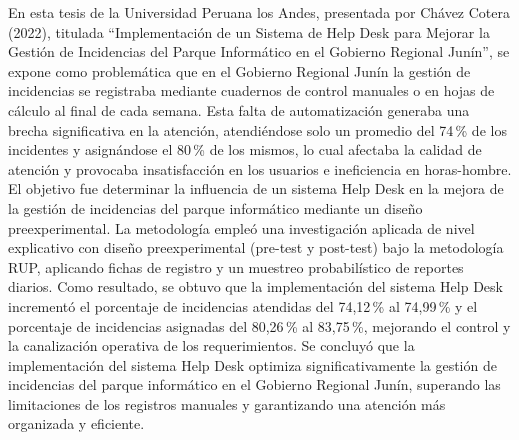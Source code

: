 En esta tesis de la Universidad Peruana los Andes, presentada por Chávez Cotera (2022), titulada ``Implementación de un Sistema de Help Desk para Mejorar la Gestión de Incidencias del Parque Informático en el Gobierno Regional Junín'', se expone como problemática que en el Gobierno Regional Junín la gestión de incidencias se registraba mediante cuadernos de control manuales o en hojas de cálculo al final de cada semana. Esta falta de automatización generaba una brecha significativa en la atención, atendiéndose solo un promedio del 74\,\% de los incidentes y asignándose el 80\,\% de los mismos, lo cual afectaba la calidad de atención y provocaba insatisfacción en los usuarios e ineficiencia en horas-hombre. El objetivo fue determinar la influencia de un sistema Help Desk en la mejora de la gestión de incidencias del parque informático mediante un diseño preexperimental. La metodología empleó una investigación aplicada de nivel explicativo con diseño preexperimental (pre-test y post-test) bajo la metodología RUP, aplicando fichas de registro y un muestreo probabilístico de reportes diarios. Como resultado, se obtuvo que la implementación del sistema Help Desk incrementó el porcentaje de incidencias atendidas del 74,12\,\% al 74,99\,\% y el porcentaje de incidencias asignadas del 80,26\,\% al 83,75\,\%, mejorando el control y la canalización operativa de los requerimientos. Se concluyó que la implementación del sistema Help Desk optimiza significativamente la gestión de incidencias del parque informático en el Gobierno Regional Junín, superando las limitaciones de los registros manuales y garantizando una atención más organizada y eficiente.

\vspace{0.8em}

